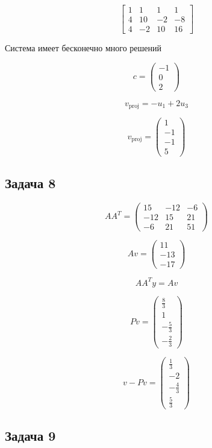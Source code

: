 \documentclass[a4paper,12pt]{article}
\begin{document}
\[
\left[\begin{array}{ccc|c}
1 & 1 & 1 & 1 \\
4 & 10 & -2 & -8 \\
4 & -2 & 10 & 16
\end{array}\right]
\]

Система имеет бесконечно много решений

\[
c = \begin{pmatrix}
    -1 \\ 0 \\ 2 
\end{pmatrix}
\]

\[
v_{\text{proj}} = -u_1 + 2u_3
\]

\[
v_{\text{proj}} = \begin{pmatrix}
    1 \\ -1 \\ -1 \\ 5
\end{pmatrix}
\]

\subsection{Задача 8}

\[
AA^T = 
\begin{pmatrix}
15 & -12 & -6 \\
-12 & 15 & 21 \\
-6 & 21 & 51 
\end{pmatrix}
\]

\[
Av = \begin{pmatrix}
    11\\ -13 \\ -17
\end{pmatrix}
\]

\[
AA^Ty=Av
\]

\[
Pv = \begin{pmatrix}
    \frac{8}{3} \\ 1 \\ -\frac{5}{3} \\ -\frac{2}{3}
\end{pmatrix}
\]

\[
v - Pv = 
\begin{pmatrix}
    \frac{1}{3} \\ -2 \\ -\frac{4}{3} \\ \frac{5}{3}
\end{pmatrix}
\]

\subsection{Задача 9}
\end{document}
